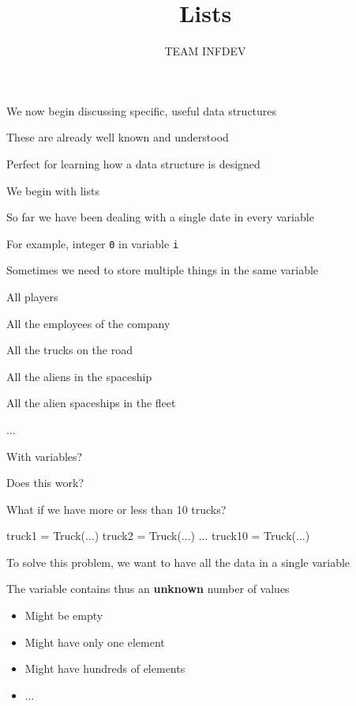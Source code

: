 \documentclass{beamer}
\title{Lists}
\author{TEAM INFDEV}
\institute{Hogeschool Rotterdam \\ 
Rotterdam, Netherlands}
\date{}
\begin{document}
\maketitle

\begin{slide}{
\item We now begin discussing specific, useful data structures
\item These are already well known and understood
\item Perfect for learning how a data structure is designed
\item We begin with lists
}\end{slide}

\begin{slide}{
\item So far we have been dealing with a single date in every variable
\item For example, integer \texttt{0} in variable \texttt{i}
\item Sometimes we need to store multiple things in the same variable
}\end{slide}

\begin{slide}{
\item All players
\item All the employees of the company
\item All the trucks on the road
\item All the aliens in the spaceship
\item All the alien spaceships in the fleet
\item ...
}\end{slide}

\begin{frame}[fragile]{With variables?}
\begin{codewithblock}{\pause \item Does this work? \item What if we have more or less than 10 trucks?}
truck1 = Truck(...)
truck2 = Truck(...)
...
truck10 = Truck(...)
\end{codewithblock}
\end{frame}

\begin{slide}{
\item To solve this problem, we want to have all the data in a single variable
\item The variable contains thus an \textbf{unknown} number of values
\begin{itemize}
\item Might be empty
\item Might have only one element
\item Might have hundreds of elements
\item ...
\end{itemize}
}\end{slide}
\end{document}
